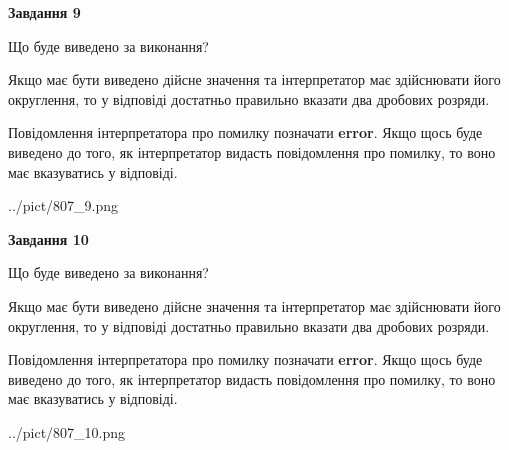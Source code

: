 \documentclass[12pt, ukrainian]{article}
\begin{document}
{\begin {Large}
{\begin {center}\textbf{Завдання 9}\end {center}}\par
Що буде виведено за виконання? \par

Якщо має бути виведено дійсне значення та інтерпретатор має здійснювати його округлення, 
то у відповіді достатньо правильно вказати два дробових розряди.

Повідомлення інтерпретатора про помилку позначати \textbf{error}.
Якщо щось буде виведено до того, як інтерпретатор видасть повідомлення про помилку, 
то воно має вказуватись у відповіді. \par

\begin{center}
	{../pict/807_9.png}
\end{center}
\newpage

{\begin {center}\textbf{Завдання 10}\end {center}}\par
Що буде виведено за виконання? \par

Якщо має бути виведено дійсне значення та інтерпретатор має здійснювати його округлення, 
то у відповіді достатньо правильно вказати два дробових розряди.

Повідомлення інтерпретатора про помилку позначати \textbf{error}.
Якщо щось буде виведено до того, як інтерпретатор видасть повідомлення про помилку, 
то воно має вказуватись у відповіді. \par

\begin{center}
	{../pict/807_10.png}
\end{center}
\newpage

\end {Large}}
\end{document}
